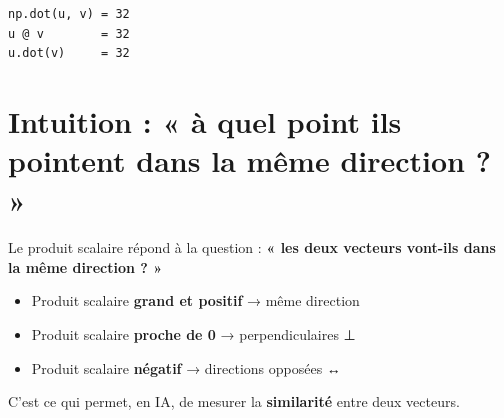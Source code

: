 \documentclass[
  french,
  11pt,
  a4paper,
]{scrbook}
\providecommand{\tightlist}{%
  \setlength{\itemsep}{0pt}\setlength{\parskip}{0pt}}
\begin{document}
\begin{verbatim}
np.dot(u, v) = 32
u @ v        = 32
u.dot(v)     = 32
\end{verbatim}

\section{Intuition : « à quel point ils pointent dans la même direction
?
»}\label{intuition-uxe0-quel-point-ils-pointent-dans-la-muxeame-direction}

Le produit scalaire répond à la question : \textbf{« les deux vecteurs
vont-ils dans la même direction ? »}

\begin{itemize}
\tightlist
\item
  Produit scalaire \textbf{grand et positif} → même direction 🔗
\item
  Produit scalaire \textbf{proche de 0} → perpendiculaires ⊥
\item
  Produit scalaire \textbf{négatif} → directions opposées ↔️
\end{itemize}

C'est ce qui permet, en IA, de mesurer la \textbf{similarité} entre deux
vecteurs.
\end{document}
